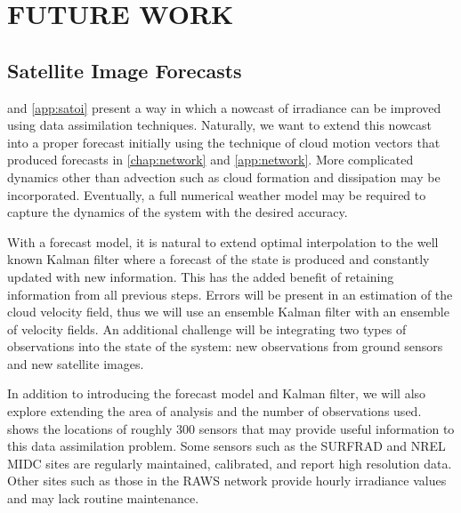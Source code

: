 \chapter{FUTURE WORK}
\label{chap:satfx}
\label{chap:future_work}


\section{Satellite Image Forecasts}
\label{sec:satellite_fx}

 and \cref{app:satoi} present a way in which a
nowcast of irradiance can be improved using data assimilation
techniques.
Naturally, we want to extend this nowcast into a proper forecast
initially using the technique of cloud motion vectors that produced
forecasts in \cref{chap:network} and \cref{app:network}.
More complicated dynamics other than advection such as cloud formation
and dissipation may be incorporated.
Eventually, a full numerical weather model may be required to capture
the dynamics of the system with the desired accuracy.


With a forecast model, it is natural to extend optimal interpolation
to the well known Kalman filter where a forecast of the state is
produced and constantly updated with new information.
This has the added benefit of retaining information from all previous
steps.
Errors will be present in an estimation of the cloud velocity field,
thus we will use an ensemble Kalman filter with an ensemble of
velocity fields.
An additional challenge will be integrating two types of observations
into the state of the system: new observations from ground sensors and
new satellite images.


In addition to introducing the forecast model and Kalman filter, we
will also explore extending the area of analysis and the number of
observations used.
 shows the locations of roughly 300 sensors that
may provide useful information to this data assimilation problem.
Some sensors such as the SURFRAD and NREL MIDC sites are regularly
maintained, calibrated, and report high resolution data.
Other sites such as those in the RAWS network provide hourly
irradiance values and may lack routine maintenance.

